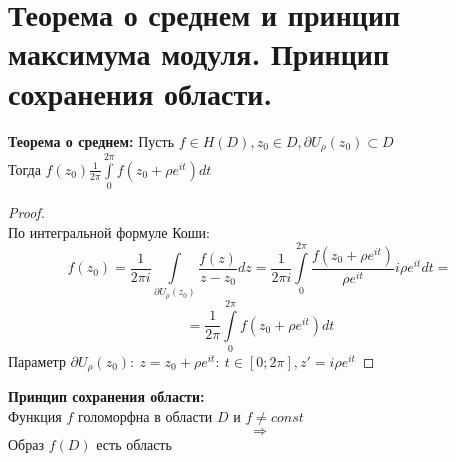 \newpage
\section{Теорема о среднем и принцип максимума модуля. Принцип сохранения области.}

\textbf{Теорема о среднем:}
Пусть $f \in H(D), z_0 \in D, \partial U_{\rho}(z_0)\subset D$\\
Тогда $f(z_0)\frac{1}{2\pi} \int\limits_{0}^{2\pi} f(z_0+\rho e^{it})dt$

\begin{proof}
    \ \\
    По интегральной формуле Коши:
    $$f(z_0)=\frac{1}{2\pi i}\int\limits_{\partial U_{\rho}(z_0)}\frac{f(z)}{z-z_0}dz = \frac{1}{2\pi i} \int\limits_{0}^{2\pi}\frac{f(z_0+\rho e^{it})}{\rho e^{it}}i\rho e^{it}dt=$$
    $$=\frac{1}{2\pi}\int\limits_0^{2\pi}f(z_0+\rho e^{it})dt$$
    Параметр $\partial U_{\rho}(z_0): \ z=z_0+\rho e^{it}: \ t\in[0; 2\pi], z'=i\rho e^{it}$
\end{proof}

\textbf{Принцип сохранения области:}\\[2mm]
Функция $f$ голоморфна в области $D$ и $f\neq const$
$$\Rightarrow$$
Образ $f(D)$ есть область

